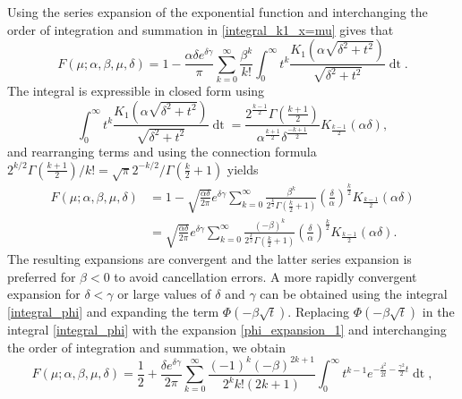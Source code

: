 \documentclass[10pt,a4paper,oneside]{article}
\numberwithin{equation}{section}
\begin{document}
Using the series expansion of the exponential function and interchanging the order of integration and summation in \eqref{integral_k1_x=mu} gives that
\begin{equation*}
F(\mu; \alpha, \beta, \mu, \delta) = 1 - \frac{\alpha \delta e^{\delta \gamma}}{\pi} \sum_{k=0}^{\infty}\frac{\beta^k}{k!}\int_{0}^{\infty} t^k \frac{K_1\left(\alpha\sqrt{\delta^2 + t^2}\right)}{\sqrt{\delta^2 + t^2}} \mathop{dt}.
\end{equation*}
The integral is expressible in closed form using \cite[\S 6.596]{gradshteyn2007}
\begin{equation*}
\int_0^{\infty} t^k \frac{K_1\left(\alpha\sqrt{\delta^2 + t^2}\right)}{\sqrt{\delta^2 + t^2}} \mathop{dt} = \frac{2^{\frac{k-1}{2}} \Gamma\left(\frac{k+1}{2}\right)}{\alpha^{\frac{k+1}{2}} \delta^{\frac{-k+1}{2}}}K_{\frac{k-1}{2}}(\alpha\delta),
\end{equation*}
and rearranging terms and using the connection formula $2^{k/2}  \Gamma\left(\frac{k+1}{2}\right)/ k! = \sqrt{\pi} 2^{-k/2} / \Gamma\left(\frac{k}{2} + 1\right)$ yields
\begin{align}
F(\mu; \alpha, \beta, \mu, \delta) &= 1 - \sqrt{\frac{\alpha \delta}{2\pi}}e^{\delta \gamma} \sum_{k=0}^{\infty}\frac{\beta^k}{2^{\frac{k}{2}}\Gamma\left(\frac{k}{2} + 1\right)} \left(\frac{\delta}{\alpha}\right)^{\frac{k}{2}} K_{\frac{k-1}{2}}(\alpha \delta)\\
&=\sqrt{\frac{\alpha \delta}{2\pi}}e^{\delta \gamma} \sum_{k=0}^{\infty}\frac{(-\beta)^k}{2^{\frac{k}{2}}\Gamma\left(\frac{k}{2} + 1\right)} \left(\frac{\delta}{\alpha}\right)^{\frac{k}{2}} K_{\frac{k-1}{2}}(\alpha \delta).
\end{align}
The resulting expansions are convergent and the latter series expansion is preferred for $\beta < 0$ to avoid cancellation errors. A more rapidly convergent expansion for $\delta < \gamma$ or large values of $\delta$ and $\gamma$ can be obtained using the integral \eqref{integral_phi} and expanding the term $\Phi(-\beta\sqrt{t})$. Replacing $\Phi(-\beta\sqrt{t})$ in the integral \eqref{integral_phi} with the expansion \eqref{phi_expansion_1} and interchanging the order of integration and summation, we obtain
\begin{equation}\label{expansion_x=mu_pre}
F(\mu; \alpha, \beta, \mu, \delta) = \frac{1}{2} + \frac{\delta e^{\delta \gamma}}{2\pi}\sum_{k=0}^{\infty}\frac{(-1)^k (-\beta)^{2k+1}}{2^k k! (2k+1)} \int_0^{\infty} t^{k - 1} e^{-\frac{\delta^2}{2t} - \frac{\gamma^2}{2}t} \mathop{dt},
\end{equation}
\end{document}
